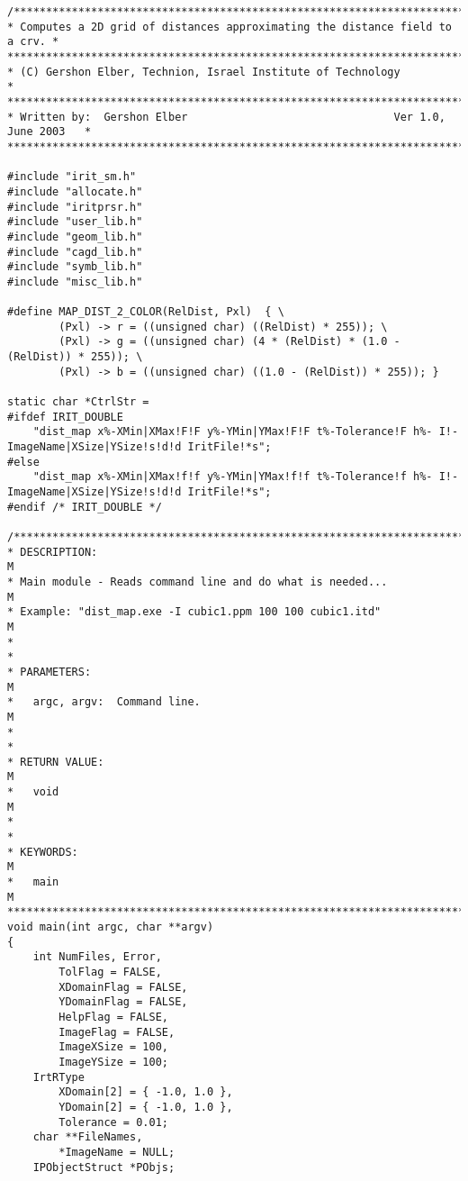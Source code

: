 \begin{verbatim}
/*****************************************************************************
* Computes a 2D grid of distances approximating the distance field to a crv. *
******************************************************************************
* (C) Gershon Elber, Technion, Israel Institute of Technology                *
******************************************************************************
* Written by:  Gershon Elber                                Ver 1.0, June 2003   *
*****************************************************************************/

#include "irit_sm.h"
#include "allocate.h"
#include "iritprsr.h"
#include "user_lib.h"
#include "geom_lib.h"
#include "cagd_lib.h"
#include "symb_lib.h"
#include "misc_lib.h"

#define MAP_DIST_2_COLOR(RelDist, Pxl)  { \
        (Pxl) -> r = ((unsigned char) ((RelDist) * 255)); \
        (Pxl) -> g = ((unsigned char) (4 * (RelDist) * (1.0 - (RelDist)) * 255)); \
        (Pxl) -> b = ((unsigned char) ((1.0 - (RelDist)) * 255)); }

static char *CtrlStr =
#ifdef IRIT_DOUBLE
    "dist_map x%-XMin|XMax!F!F y%-YMin|YMax!F!F t%-Tolerance!F h%- I!-ImageName|XSize|YSize!s!d!d IritFile!*s";
#else
    "dist_map x%-XMin|XMax!f!f y%-YMin|YMax!f!f t%-Tolerance!f h%- I!-ImageName|XSize|YSize!s!d!d IritFile!*s";
#endif /* IRIT_DOUBLE */

/*****************************************************************************
* DESCRIPTION:                                                               M
* Main module - Reads command line and do what is needed...                     M
* Example: "dist_map.exe -I cubic1.ppm 100 100 cubic1.itd"                     M
*                                                                            *
* PARAMETERS:                                                                M
*   argc, argv:  Command line.                                               M
*                                                                            *
* RETURN VALUE:                                                              M
*   void                                                                     M
*                                                                            *
* KEYWORDS:                                                                  M
*   main                                                                     M
*****************************************************************************/
void main(int argc, char **argv)
{
    int NumFiles, Error,
        TolFlag = FALSE,
        XDomainFlag = FALSE,
        YDomainFlag = FALSE,
        HelpFlag = FALSE,
        ImageFlag = FALSE,
        ImageXSize = 100,
        ImageYSize = 100;
    IrtRType
        XDomain[2] = { -1.0, 1.0 },
        YDomain[2] = { -1.0, 1.0 },
        Tolerance = 0.01;
    char **FileNames,
        *ImageName = NULL;
    IPObjectStruct *PObjs;


\end{verbatim}

